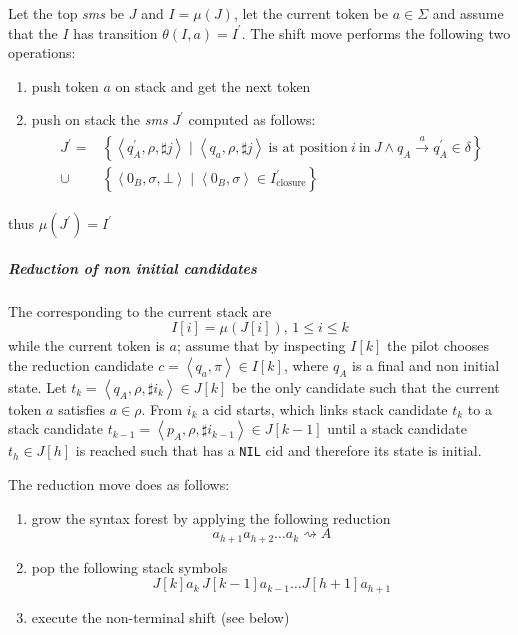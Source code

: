 \documentclass[english]{article}
\begin{document}
Let the top \textit{sms} be \(J\) and \(I = \mu(J)\), let the current token be \(a \in \Sigma\) and assume that the \mstate \(I\) has transition \(\theta(I, a) = I^\prime\). The shift move performs the following two operations:
\begin{enumerate}[label=\arabic*., ref=(\arabic*)]
  \item\label{enum:shift-move-1} push token \(a\) on stack and get the next token
  \item\label{enum:shift-move-2} push on stack the \textit{sms} \(J^\prime\) computed as follows:
  \begin{gather*}
    \begin{aligned}
      J^\prime  = & \left\{ \left\langle q_A^\prime, \rho, \sharp j \right\rangle \mid \left\langle q_a, \rho, \sharp j \right\rangle \ \text{is at position} \ i \ \text{in} \ J \land q_A \xrightarrow{a} q_A^\prime \in \delta \right\} \\
      \cup        & \left\{ \left\langle 0_B, \sigma, \bot \right\rangle \mid \left\langle 0_B, \sigma  \right\rangle \in I_{\text{closure}}^\prime \right\}
    \end{aligned}
  \end{gather*}
\end{enumerate}
thus \(\mu(J^\prime) = I^\prime\)

\subparagraph*{Reduction of non initial candidates}

The \mstates corresponding to the current stack are
\[ I[i] = \mu\left( J[i] \right), \, 1 \leq i \leq k \]
while the current token is \(a\);
assume that by inspecting \(I[k]\) the pilot chooses the reduction candidate \(c = \left\langle q_a, \pi \right\rangle \in I[k]\), where \(q_A\) is a final and non initial state.
Let \(t_k = \left\langle q_A, \rho, \sharp i_k \right\rangle \in J[k]\) be the only candidate such that the current token \(a\) satisfies \(a \in \rho\).
From \(i_k\) a cid starts, which links stack candidate \(t_k\) to a stack candidate \(t_{k-1} = \left\langle p_A, \rho, \sharp i_{k-1} \right\rangle \in J[k-1]\) until a stack candidate \(t_h \in J[h]\) is reached such that has a \texttt{NIL} cid and therefore its state is initial.

The reduction move does as follows:

\begin{enumerate}
  \item grow the syntax forest by applying the following reduction
        \[ a_{h+1} a_{h+2} \ldots a_k \rightsquigarrow A \]
  \item pop the following stack symbols
        \[ J[k] a_k \, J[k-1] a_{k-1} \ldots J[h+1] a_{h+1} \]
  \item execute the non-terminal shift (see below)
\end{enumerate}
\end{document}
